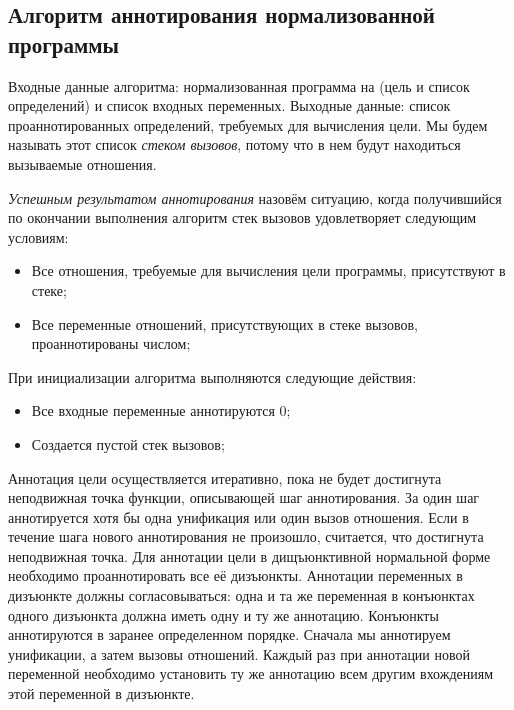 \subsection{Алгоритм аннотирования нормализованной программы}

Входные данные алгоритма: нормализованная программа на \miniKanren{} (цель и список определений) и список входных переменных.
Выходные данные: список проаннотированных определений, требуемых для вычисления цели.
Мы будем называть этот список \emph{стеком вызовов}, потому что в нем будут находиться вызываемые отношения.

\emph{Успешным результатом аннотирования} назовём ситуацию, когда получившийся по окончании выполнения алгоритм стек вызовов удовлетворяет следующим условиям:
\begin{itemize}
    \item Все отношения, требуемые для вычисления цели программы, присутствуют в стеке;
    \item Все переменные отношений, присутствующих в стеке вызовов, проаннотированы числом;
\end{itemize}

При инициализации алгоритма выполняются следующие действия: 
\begin{itemize}
    \item Все входные переменные аннотируются $0$;
    \item Создается пустой стек вызовов;
\end{itemize}

Аннотация цели осуществляется итеративно, пока не будет достигнута неподвижная точка функции, описывающей шаг аннотирования. 
За один шаг аннотируется хотя бы одна унификация или один вызов отношения.
Если в течение шага нового аннотирования не произошло, считается, что достигнута неподвижная точка.
Для аннотации цели в дищъюнктивной нормальной форме необходимо проаннотировать все её дизъюнкты. 
Аннотации переменных в дизъюнкте должны согласовываться: одна и та же переменная в конъюнктах одного дизъюнкта должна иметь одну и ту же аннотацию.
Конъюнкты аннотируются в заранее определенном порядке. 
Сначала мы аннотируем унификации, а затем вызовы отношений. 
Каждый раз при аннотации новой переменной необходимо установить ту же аннотацию всем другим вхождениям этой переменной в дизъюнкте. 

